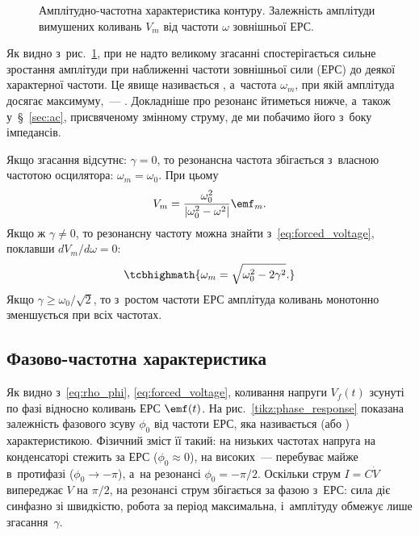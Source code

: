 \begin{figure}[h!]
	\centering
	\caption{Амплітудно-частотна характеристика контуру. Залежність амплітуди вимушених коливань $V_m$ від частоти $\omega$ зовнішньої ЕРС.}
	\label{tikz:amplitude_response}
\end{figure}

Як видно з~рис.~\ref{tikz:amplitude_response}, при не надто великому згасанні спостерігається сильне зростання амплітуди при наближенні частоти
зовнішньої сили (ЕРС) до деякої характерної частоти. Це явище
називається , а~частота $\omega_m$, при якій амплітуда досягає
максимуму,~--- . Докладніше про резонанс йтиметься нижче, а~також у~\S~\ref{sec:ac}, присвяченому змінному струму, де ми побачимо його з~боку імпедансів.

Якщо згасання відсутнє: $\gamma = 0$, то резонансна частота збігається з~власною частотою осцилятора: $\omega_m = \omega_0$. При цьому
\begin{equation*}
	V_m = \frac{\omega_0^2}{\left|\omega_0^2 - \omega^2\right|}\emf_m.
\end{equation*}
Якщо ж $\gamma \neq 0$, то резонансну частоту можна знайти з~\eqref{eq:forced_voltage}, поклавши
$dV_m/d\omega = 0$:
\begin{equation*}
	\tcbhighmath{
		\omega_m = \sqrt{\omega_0^2 - 2\gamma^2}.
	}
\end{equation*}
Якщо $\gamma \geqslant \omega_0/\sqrt{2}$, то з~ростом частоти ЕРС амплітуда коливань монотонно зменшується при всіх частотах.

\subsection*{Фазово-частотна характеристика}

Як видно з~\eqref{eq:rho_phi}, \eqref{eq:forced_voltage}, коливання напруги $V_f(t)$ зсунуті по фазі відносно коливань ЕРС $\emf(t)$. На рис.~\ref{tikz:phase_response} показана залежність фазового зсуву $\phi_0$ від частоти ЕРС, яка називається  (або ) характеристикою. Фізичний зміст її такий: на низьких частотах напруга на конденсаторі стежить за ЕРС ($\phi_0\approx 0$), на високих~--- перебуває майже в~протифазі ($\phi_0\to-\pi$), а~на резонансі $\phi_0=-\pi/2$. Оскільки струм $I=C\dot V$ випереджає $V$ на $\pi/2$, на резонансі струм збігається за фазою з~ЕРС: сила діє синфазно зі швидкістю, робота за період максимальна, і~амплітуду обмежує лише згасання~$\gamma$.

